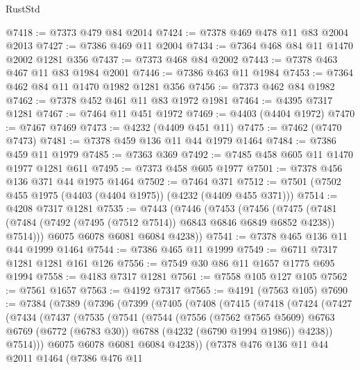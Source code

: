 \begin{lexlean}{RustStd}
\begin{coremodule}
@7418 := @7373 @479 @84 @2014
@7424 := @7378 @469 @478 @11 @83 @2004 @2013
@7427 := @7386 @469 @11 @2004
@7434 := @7364 @468 @84 @11 @1470 @2002 @1281 @356
@7437 := @7373 @468 @84 @2002
@7443 := @7378 @463 @467 @11 @83 @1984 @2001
@7446 := @7386 @463 @11 @1984
@7453 := @7364 @462 @84 @11 @1470 @1982 @1281 @356
@7456 := @7373 @462 @84 @1982
@7462 := @7378 @452 @461 @11 @83 @1972 @1981
@7464 := @4395 @7317 @1281
@7467 := @7464 @11 @451 @1972
@7469 := @4403 (@4404 @1972)
@7470 := @7467 @7469
@7473 := @4232 (@4409 @451 @11)
@7475 := @7462 (@7470 @7473)
@7481 := @7378 @459 @136 @11 @44 @1979 @1464
@7484 := @7386 @459 @11 @1979
@7485 := @7363 @369
@7492 := @7485 @458 @605 @11 @1470 @1977 @1281 @611
@7495 := @7373 @458 @605 @1977
@7501 := @7378 @456 @136 @371 @44 @1975 @1464
@7502 := @7464 @371
@7512 := @7501 (@7502 @455 @1975 (@4403 (@4404 @1975)) (@4232 (@4409 @455 @371)))
@7514 := @4208 @7317 @1281
@7535 := @7443
    (@7446
      (@7453
        (@7456
          (@7475 (@7481 (@7484 (@7492 (@7495 (@7512 @7514)) @6843 @6846 @6849 @6852 @4238)) @7514)))
        @6075
        @6078
        @6081
        @6084
        @4238))
@7541 := @7378 @465 @136 @11 @44 @1999 @1464
@7544 := @7386 @465 @11 @1999
@7549 := @6711 @7317 @1281 @1281 @161 @126
@7556 := @7549 @30 @86 @11 @1657 @1775 @695 @1994
@7558 := @4183 @7317 @1281
@7561 := @7558 @105 @127 @105
@7562 := @7561 @1657
@7563 := @4192 @7317
@7565 := @4191 (@7563 @105)
@7690 := @7384
    (@7389
      (@7396
        (@7399
          (@7405
            (@7408
              (@7415
                (@7418
                  (@7424
                    (@7427
                      (@7434
                        (@7437
                          (@7535
                            (@7541
                              (@7544
                                (@7556
                                  (@7562 @7565 @5609)
                                  @6763
                                  @6769
                                  (@6772 (@6783 @30))
                                  @6788
                                  (@4232 (@6790 @1994 @1986))
                                  @4238))
                              @7514)))
                        @6075
                        @6078
                        @6081
                        @6084
                        @4238))
                    (@7378
                      @476
                      @136
                      @11
                      @44
                      @2011
                      @1464
                      (@7386
                        @476
                        @11

\end{coremodule}
\end{lexlean}
